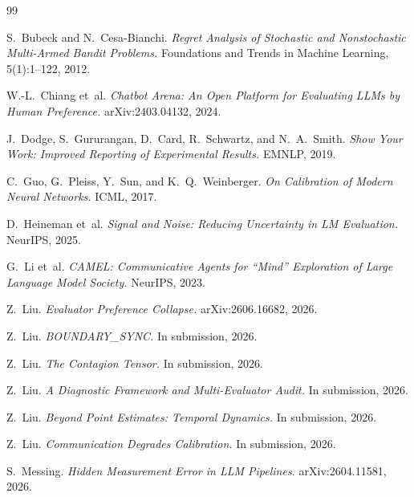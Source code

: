 \documentclass[11pt]{article}
\begin{document}
\begin{thebibliography}{99}

 S.~Bubeck and N.~Cesa-Bianchi.
\newblock \textit{Regret Analysis of Stochastic and Nonstochastic Multi-Armed Bandit Problems.}
\newblock Foundations and Trends in Machine Learning, 5(1):1--122, 2012.

 W.-L.~Chiang et~al.
\newblock \textit{Chatbot Arena: An Open Platform for Evaluating LLMs by Human Preference.}
\newblock arXiv:2403.04132, 2024.

 J.~Dodge, S.~Gururangan, D.~Card, R.~Schwartz, and N.~A.~Smith.
\newblock \textit{Show Your Work: Improved Reporting of Experimental Results.}
\newblock EMNLP, 2019.

 C.~Guo, G.~Pleiss, Y.~Sun, and K.~Q.~Weinberger.
\newblock \textit{On Calibration of Modern Neural Networks.}
\newblock ICML, 2017.

 D.~Heineman et~al.
\newblock \textit{Signal and Noise: Reducing Uncertainty in LM Evaluation.}
\newblock NeurIPS, 2025.

 G.~Li et~al.
\newblock \textit{CAMEL: Communicative Agents for ``Mind'' Exploration of Large Language Model Society.}
\newblock NeurIPS, 2023.

 Z.~Liu.
\newblock \textit{Evaluator Preference Collapse.}
\newblock arXiv:2606.16682, 2026.

 Z.~Liu.
\newblock \textit{BOUNDARY\_SYNC.} In submission, 2026.

 Z.~Liu.
\newblock \textit{The Contagion Tensor.} In submission, 2026.

 Z.~Liu.
\newblock \textit{A Diagnostic Framework and Multi-Evaluator Audit.} In submission, 2026.

 Z.~Liu.
\newblock \textit{Beyond Point Estimates: Temporal Dynamics.} In submission, 2026.

 Z.~Liu.
\newblock \textit{Communication Degrades Calibration.} In submission, 2026.

 S.~Messing.
\newblock \textit{Hidden Measurement Error in LLM Pipelines.}
\newblock arXiv:2604.11581, 2026.


\end{thebibliography}
\end{document}

